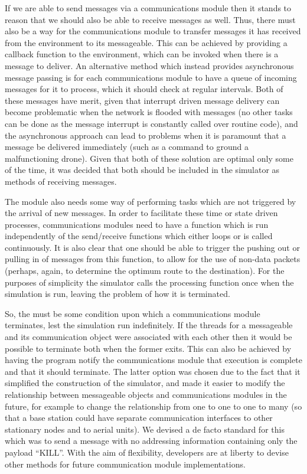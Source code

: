 If we are able to send messages via a communications module then it stands to reason that we should also be able to receive messages as well. Thus, there must also be a way for the communications module to transfer messages it has received from the environment to its messageable. This can be achieved by providing a callback function to the environment, which can be invoked when there is a message to deliver. An alternative method which instead provides asynchronous message passing is for each communications module to have a queue of incoming messages for it to process, which it should check at regular intervals. Both of these messages have merit, given that interrupt driven message delivery can become problematic when the network is flooded with messages (no other tasks can be done as the message interrupt is constantly called over routine code), and the asynchronous approach can lead to problems when it is paramount that a message be delivered immediately (such as a command to ground a malfunctioning drone). Given that both of these solution are optimal only some of the time, it was decided that both should be included in the simulator as methods of receiving messages.

The module also needs some way of performing tasks which are not triggered by the arrival of new messages. In order to facilitate these time or state driven processes, communications modules need to have a function which is run independently of the send/receive functions which either loops or is called continuously. It is also clear that one should be able to trigger the pushing out or pulling in of messages from this function, to allow for the use of non-data packets (perhaps, again, to determine the optimum route to the destination). For the purposes of simplicity the simulator calls the processing function once when the simulation is run, leaving the problem of how it is terminated.

So, the must be some condition upon which a communications module terminates, lest the simulation run indefinitely. If the threads for a messageable and its communication object were associated with each other then it would be possible to terminate both when the former exits. This can also be achieved by having the program notify the communications module that execution is complete and that it should terminate. The latter option was chosen due to the fact that it simplified the construction of the simulator, and made it easier to modify the relationship between messageable objects and communications modules in the future, for example to change the relationship from one to one to one to many (so that a base station could have separate communication interfaces to other stationary nodes and to aerial units). We devised a de facto standard for this which was to send a message with no addressing information containing only the payload ``KILL''. With the aim of flexibility, developers are at liberty to devise other methods for future communication module implementations.

